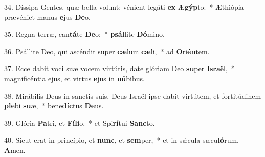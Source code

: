34. Díssipa Gentes, quæ bella volunt: vénient legáti \textbf{ex} Æ\textbf{gýp}to:~*  Æthiópia prævéniet manus \textbf{e}jus \textbf{De}o.\

35. Regna terræ, can\textbf{tá}te \textbf{De}o:~*  \textbf{psál}lite \textbf{Dó}mino.\

36. Psállite Deo, qui ascéndit super \textbf{cæ}lum \textbf{cæ}li,~*  ad \textbf{O}ri\textbf{én}tem.\

37. Ecce dabit voci suæ vocem virtútis, date glóriam Deo \textbf{su}per \textbf{Is}\textbf{ra}ël,~*  magnificéntia ejus, et virtus \textbf{e}jus in \textbf{nú}bibus.\

38. Mirábilis Deus in sanctis suis, Deus Israël ipse dabit virtútem, et fortitúdinem \textbf{ple}bi \textbf{su}æ,~*  bene\textbf{díc}tus \textbf{De}us.\

39. Glória \textbf{Pa}tri, et \textbf{Fí}\textbf{li}o,~*  et Spi\textbf{rí}tui \textbf{Sanc}to.\

40. Sicut erat in princípio, et \textbf{nunc}, et \textbf{sem}per,~*  et in sǽcula sæcu\textbf{ló}rum. \textbf{A}men.\

